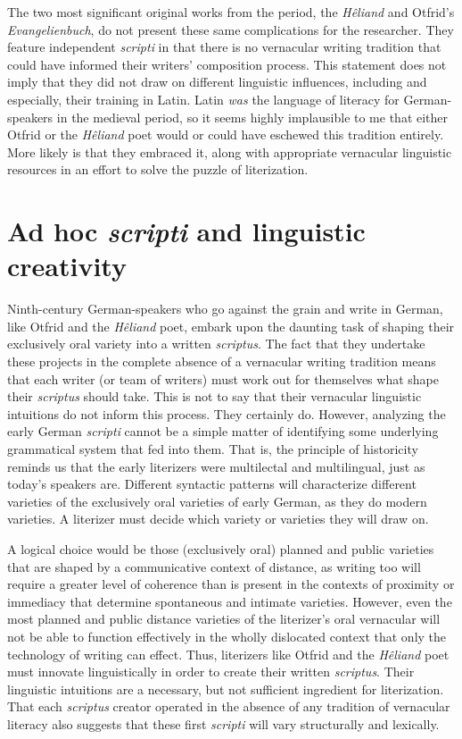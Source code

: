 The two most significant original works from the period, the \textit{Hêliand} and Otfrid’s \textit{Evangelienbuch}, do not present these same complications for the researcher. They feature independent \textit{scripti} in that there is no vernacular writing tradition that could have informed their writers’ composition process. This statement does not imply that they did not draw on different linguistic influences, including and especially, their training in Latin. Latin \textit{was} the language of literacy for German-speakers in the medieval period, so it seems highly implausible to me that either Otfrid or the \textit{Hêliand} poet would or could have eschewed this tradition entirely. More likely is that they embraced it, along with appropriate vernacular linguistic resources in an effort to solve the puzzle of literization.

\section{Ad hoc \textit{scripti} and linguistic creativity}\label{sec:3:3.2}

  Ninth-century German-speakers who go against the grain and write in German, like Otfrid and the \textit{Hêliand} poet, embark upon the daunting task of shaping their exclusively oral variety into a written \textit{scriptus}. The fact that they undertake these projects in the complete absence of a vernacular writing tradition means that each writer (or team of writers) must work out for themselves what shape their \textit{scriptus} should take. This is not to say that their vernacular linguistic intuitions do not inform this process. They certainly do. However, analyzing the early German \textit{scripti} cannot be a simple matter of identifying some underlying grammatical system that fed into them. That is, the principle of historicity reminds us that the early literizers were multilectal and multilingual, just as today’s speakers are. Different syntactic patterns will characterize different varieties of the exclusively oral varieties of early German, as they do modern varieties. A literizer must decide which variety or varieties they will draw on.

A logical choice would be those (exclusively oral) planned and public varieties that are shaped by a communicative context of distance, as writing too will require a greater level of coherence than is present in the contexts of proximity or immediacy that determine spontaneous and intimate varieties. However, even the most planned and public distance varieties of the literizer’s oral vernacular will not be able to function effectively in the wholly dislocated context that only the technology of writing can effect. Thus, literizers like Otfrid and the \textit{Hêliand} poet must innovate linguistically in order to create their written \textit{scriptus}. Their linguistic intuitions are a necessary, but not sufficient ingredient for literization. That each \textit{scriptus} creator operated in the absence of any tradition of vernacular literacy also suggests that these first \textit{scripti} will vary structurally and lexically.

